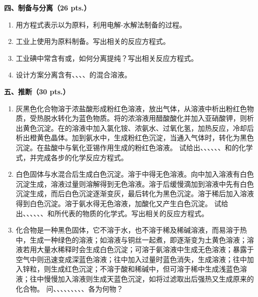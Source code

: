 \vspace{0.5cm}
\noindent\textbf{四、制备与分离（26 pts.）}

\begin{enumerate}[label=\arabic*., start=1, itemsep=1.5ex]
    \item 用方程式表示以为原料，利用电解-水解法制备的过程。
    \item 工业上使用为原料制备。写出相关的反应方程式。
    \item 工业碘中常含有或，如何分离提纯？写出相关反应方程式。
    \item 设计方案分离含有、、、、的混合溶液。
\end{enumerate}

\vspace{0.5cm}
\noindent\textbf{五、推断（30 pts.）}

\begin{enumerate}[label=\arabic*., start=1, itemsep=1.5ex]
    \item 灰黑色化合物溶于浓盐酸形成粉红色溶液，放出气体，从溶液中析出粉红色物质，受热脱水转化为蓝色物质。将的浓溶液用醋酸酸化并加入亚硝酸钾，则析出黄色沉淀。在的溶液中加入氯化铵、浓氨水、过氧化氢，加热反应，冷却后析出橙黄色晶体。加到氨水中，生成粉红色沉淀，当通入气体时，转化为黑色沉淀。在盐酸中与氧化亚锡作用生成的粉红色溶液。
    试给出、、、、、、和的化学式，并完成各步的化学反应方程式。
    \item 白色固体与水混合后生成白色沉淀。溶于中得无色溶液。向中加入溶液有白色沉淀生成，溶液过量则溶解得到无色溶液。溶于后缓慢滴加到溶液中先有白色沉淀生成，而后白色沉淀逐渐变灰，最后转化为黑色沉淀。溶于稀后加入溶液得到白色沉淀。溶于氨水得无色溶液，加酸化又产生白色沉淀。
    试给出、、、、、、和所代表的物质的化学式。写出相关的反应方程式。
    \item 化合物是一种黑色固体，它不溶于水，也不溶于稀及稀碱溶液，而易溶于热中，生成一种绿色的溶液；如溶液与铜丝一起煮，即逐渐变为土黄色溶液；溶液若用大量水稀释时会生成白色沉淀；可溶于氨溶液中生成无色溶液；暴露于空气中则迅速变成深蓝色溶液；往中加入过量时蓝色消失，生成溶液；往中加入锌粒，则生成红色沉淀；不溶于酸和稀碱中，但可溶于稀中生成浅蓝色溶液；往中慢慢加入溶液则生成天蓝色沉淀，如将过滤取出后强热又生成原来的化合物。
    问、、、、、、、、、各为何物？
\end{enumerate}